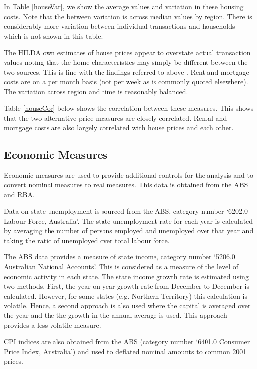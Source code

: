 \documentclass[12pt]{article}
\begin{document}
In Table \ref{houseVar}, we show the average values and variation in these housing costs. Note that the between variation is across median values by region. There is considerably more variation between individual transactions and households which is not shown in this table.



The HILDA own estimates of house prices appear to overstate actual transaction values noting that the home characteristics may simply be different between the two sources. This is line with the findings referred to above \parencite{henriques2013perceptions}. Rent and mortgage costs are on a per month basis (not per week as is commonly quoted elsewhere). The variation across region and time is reasonably balanced.

Table \ref{houseCor} below shows the correlation between these measures. This shows that the two alternative price measures are closely correlated. Rental and mortgage costs are also largely correlated with house prices and each other.



\subsection{Economic Measures}

Economic measures are used to provide additional controls for the analysis and to convert nominal measures to real measures. This data is obtained from the ABS and RBA.

Data on state unemployment is sourced from the ABS, category number `6202.0 Labour Force, Australia'. The state unemployment rate for each year is calculated by averaging the number of persons employed and unemployed over that year and taking the ratio of unemployed over total labour force.

The ABS data provides a measure of state income, category number `5206.0 Australian National Accounts'. This is considered as a measure of the level of economic activity in each state. The state income growth rate is estimated using two methods. First, the year on year growth rate from December to December is calculated. However, for some states (e.g. Northern Territory) this calculation is volatile. Hence, a second approach is also used where the capital is averaged over the year and the the growth in the annual average is used. This approach provides a less volatile measure.

CPI indices are also obtained from the ABS (category number `6401.0 Consumer Price Index, Australia') and used to deflated nominal amounts to common 2001 prices.
\end{document}
